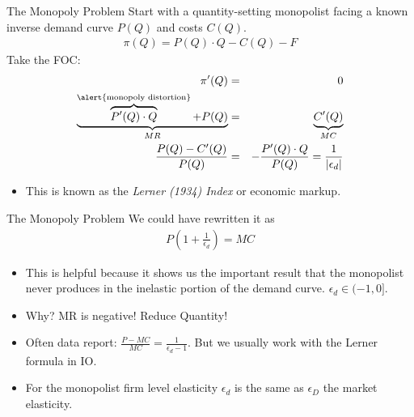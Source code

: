 \documentclass[xcolor=pdftex,dvipsnames,table,mathserif,aspectratio=169]{beamer}
\begin{document}
\begin{frame}{The Monopoly Problem}
Start with a quantity-setting monopolist facing a known inverse demand curve $P(Q)$ and costs $C(Q)$.
\begin{eqnarray*}
\pi(Q) = P(Q) \cdot Q - C(Q) -  F
\end{eqnarray*}
Take the FOC:
\begin{eqnarray*}
\pi'(Q) &=& 0  \\
 \underbrace{\overbrace{P'(Q) \cdot Q}^{\text{\alert{monopoly distortion}}}+ P(Q)}_{MR}  &=&  \underbrace{C'(Q)}_{MC} \\
  \frac{P(Q) - C'(Q)}{P(Q)} &=& - \frac{P'(Q) \cdot Q}{P(Q)} = \frac{1}{|\epsilon_d|}
\end{eqnarray*}
\begin{itemize}
\item This is known as the \textit{Lerner (1934) Index} or \alert{economic markup}.
\end{itemize}
\end{frame}

\begin{frame}{The Monopoly Problem}
We could have rewritten it as 
\begin{eqnarray*}
P \left( 1+\frac{1}{\epsilon_d} \right) = MC
\end{eqnarray*}
\begin{itemize}
\item This is helpful because it shows us the important result that the monopolist never produces in the inelastic portion of the demand curve. $\epsilon_d \in (-1,0]$.
\item Why? MR is negative! Reduce Quantity!
\item Often data report: $\frac{P-MC}{MC}= \frac{1}{\epsilon_d -1}$. But we usually work with the Lerner formula in IO.
\item For the monopolist firm level elasticity $\epsilon_d$ is the same as $\epsilon_D$ the market elasticity.
\end{itemize}
\end{frame}
\end{document}
